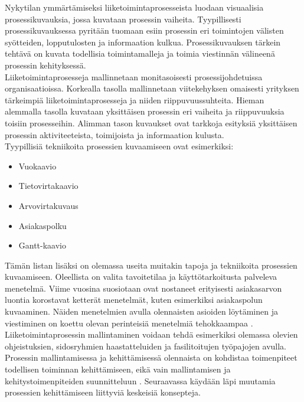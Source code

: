 \documentclass[finnish,12pt,a4paper,pdftex]{article}
\begin{document}
Nykytilan ymmärtämiseksi liiketoimintaprosesseista luodaan visuaalisia prosessikuvauksia, jossa kuvataan prosessin vaiheita. Tyypillisesti prosessikuvauksessa pyritään tuomaan esiin prosessin eri toimintojen välisten syötteiden, lopputulosten ja informaation kulkua. Prosessikuvauksen tärkein tehtävä on kuvata todellisia toimintamalleja ja toimia viestinnän välineenä prosessin kehityksessä. \citep{ohjelmistotuotanto}\\

Liiketoimintaprosesseja mallinnetaan monitasoisesti prosessijohdetuissa organisaatioissa. Korkealla tasolla mallinnetaan viitekehyksen omaisesti yrityksen tärkeimpiä liiketoimintaprosesseja ja niiden riippuvuussuhteita. Hieman alemmalla tasolla kuvataan yksittäisen prosessin eri vaiheita ja riippuvuuksia toisiin prosesseihin. Alimman tason kuvaukset ovat tarkkoja esityksiä yksittäisen prosessin aktiviteeteista, toimijoista ja informaation kulusta. \citep{teollisuustalous} \\

Tyypillisiä tekniikoita prosessien kuvaamiseen ovat esimerkiksi:

\begin{itemize}

\setlength{\itemsep}{0pt}
    \item Vuokaavio
    \item Tietovirtakaavio
    \item Arvovirtakuvaus
    \item Asiakaspolku
    \item Gantt-kaavio
\end{itemize}

Tämän listan lisäksi on olemassa useita muitakin tapoja ja tekniikoita prosessien kuvaamiseen. Oleellista on valita tavoitetilaa ja käyttötarkoitusta palveleva menetelmä. Viime vuosina suosiotaan ovat nostaneet erityisesti asiakasarvon luontia korostavat ketterät menetelmät, kuten esimerkiksi asiakaspolun kuvaaminen. Näiden menetelmien avulla olennaisten asioiden löytäminen ja viestiminen on koettu olevan perinteisiä menetelmiä tehokkaampaa \citep{lamoureux}. \\

Liiketoimintaprosessin mallintaminen voidaan tehdä esimerkiksi olemassa olevien ohjeistuksien, sidosryhmien haastatteluiden ja fasilitoitujen työpajojen avulla. Prosessin mallintamisessa ja kehittämisessä olennaista on kohdistaa toimenpiteet todellisen toiminnan kehittämiseen, eikä vain mallintamisen ja kehitystoimenpiteiden suunnitteluun \citep{ohjelmistotuotanto}. Seuraavassa käydään läpi muutamia prosessien kehittämiseen liittyviä keskeisiä konsepteja.
\end{document}
